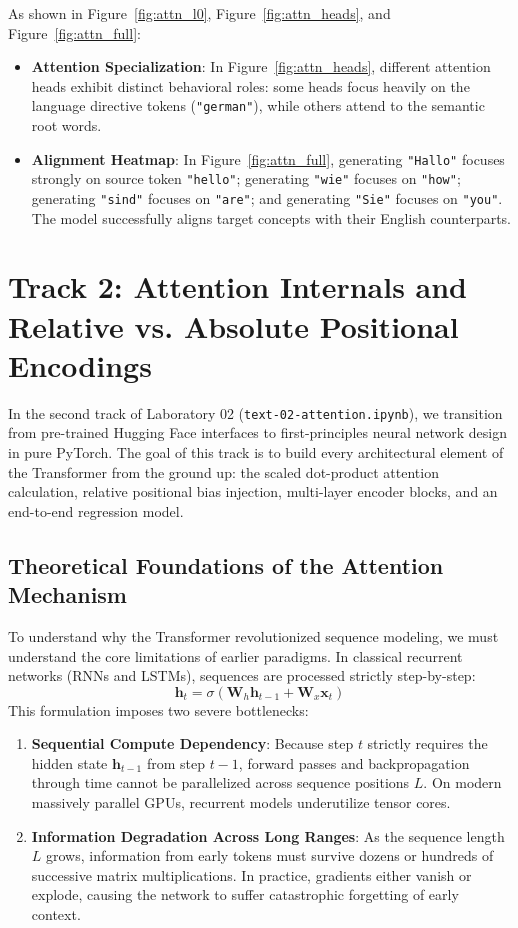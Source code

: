 \documentclass[11pt,a4paper]{article}
\begin{document}
As shown in Figure~\ref{fig:attn_l0}, Figure~\ref{fig:attn_heads}, and Figure~\ref{fig:attn_full}:
\begin{itemize}
    \item \textbf{Attention Specialization}: In Figure~\ref{fig:attn_heads}, different attention heads exhibit distinct behavioral roles: some heads focus heavily on the language directive tokens (\texttt{"german"}), while others attend to the semantic root words.
    \item \textbf{Alignment Heatmap}: In Figure~\ref{fig:attn_full}, generating \texttt{"Hallo"} focuses strongly on source token \texttt{"hello"}; generating \texttt{"wie"} focuses on \texttt{"how"}; generating \texttt{"sind"} focuses on \texttt{"are"}; and generating \texttt{"Sie"} focuses on \texttt{"you"}. The model successfully aligns target concepts with their English counterparts.
\end{itemize}


\section{Track 2: Attention Internals and Relative vs. Absolute Positional Encodings}

In the second track of Laboratory 02 (\texttt{text-02-attention.ipynb}), we transition from pre-trained Hugging Face interfaces to first-principles neural network design in pure PyTorch. The goal of this track is to build every architectural element of the Transformer from the ground up: the scaled dot-product attention calculation, relative positional bias injection, multi-layer encoder blocks, and an end-to-end regression model.

\subsection{Theoretical Foundations of the Attention Mechanism}

To understand why the Transformer revolutionized sequence modeling, we must understand the core limitations of earlier paradigms. In classical recurrent networks (RNNs and LSTMs), sequences are processed strictly step-by-step:
\begin{equation}
\mathbf{h}_t = \sigma(\mathbf{W}_h \mathbf{h}_{t-1} + \mathbf{W}_x \mathbf{x}_t)
\end{equation}
This formulation imposes two severe bottlenecks:
\begin{enumerate}
    \item \textbf{Sequential Compute Dependency}: Because step $t$ strictly requires the hidden state $\mathbf{h}_{t-1}$ from step $t-1$, forward passes and backpropagation through time cannot be parallelized across sequence positions $L$. On modern massively parallel GPUs, recurrent models underutilize tensor cores.
    \item \textbf{Information Degradation Across Long Ranges}: As the sequence length $L$ grows, information from early tokens must survive dozens or hundreds of successive matrix multiplications. In practice, gradients either vanish or explode, causing the network to suffer catastrophic forgetting of early context.
\end{enumerate}
\end{document}
